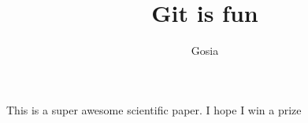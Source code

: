 \documentclass[10pt]{article}
\author{Gosia}
\title{Git is fun}
\begin{document}
	\maketitle

	This is a super awesome scientific paper.
	I hope I win a prize
\end{document}
